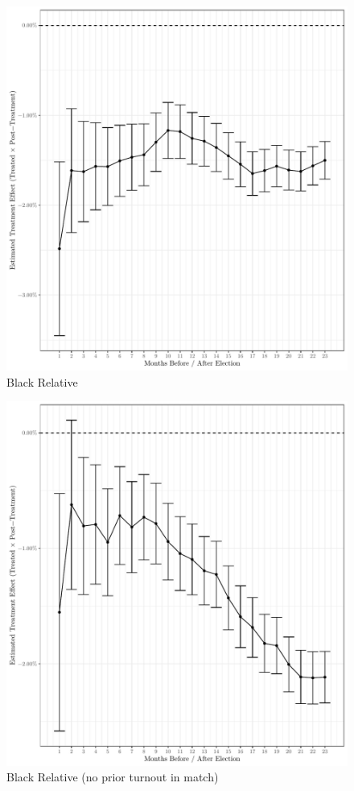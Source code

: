 \documentclass[
  12pt,
]{article}
\begin{document}
\begin{figure}[H]

{\centering \includegraphics{compile_files/figure-latex/overall-time-primary-1} 

}

\caption{\label{fig:did-1}Black Relative}\label{fig:overall-time-primary}
\end{figure}

\begin{figure}[H]

{\centering \includegraphics{compile_files/figure-latex/overall-time-no-prior-1} 

}

\caption{\label{fig:did-1}Black Relative (no prior turnout in match)}\label{fig:overall-time-no-prior}
\end{figure}
\end{document}
